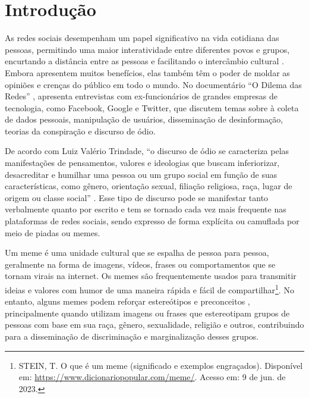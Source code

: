 \chapter{Introdução}
\label{cap:01}

As redes sociais desempenham um papel significativo na vida cotidiana das pessoas, permitindo uma maior interatividade entre diferentes povos e grupos, encurtando a distância entre as pessoas e facilitando o intercâmbio cultural \cite{FortesTecBlog2021}. Embora apresentem muitos benefícios, elas também têm o poder de moldar as opiniões e crenças do público em todo o mundo. No documentário “O Dilema das Redes” \cite{SocialDilemma2020}, apresenta entrevistas com ex-funcionários de grandes empresas de tecnologia, como Facebook, Google e Twitter, que discutem temas sobre à coleta de dados pessoais, manipulação de usuários, disseminação de desinformação, teorias da conspiração e discurso de ódio.


De acordo com Luiz Valério Trindade, ``o discurso de ódio se caracteriza pelas manifestações de pensamentos, valores e ideologias que buscam inferiorizar, desacreditar e humilhar uma pessoa ou um grupo social em função de suas características, como gênero, orientação sexual, filiação religiosa, raça, lugar de origem ou classe social'' \cite{Trindade2022}. Esse tipo de discurso pode se manifestar tanto verbalmente quanto por escrito e tem se tornado cada vez mais frequente nas plataformas de redes sociais, sendo expresso de forma explícita ou camuflada por meio de piadas ou memes.


Um meme é uma unidade cultural que se espalha de pessoa para pessoa, geralmente na forma de imagens, vídeos, frases ou comportamentos que se tornam virais na internet. Os memes são frequentemente usados para transmitir ideias e valores com humor de uma maneira rápida e fácil de compartilhar\footnote{STEIN, T. O que é um meme (significado e exemplos engraçados). Disponível em: \url{https://www.dicionariopopular.com/meme/}. Acesso em: 9 de jun. de 2023.}. No entanto, alguns memes podem reforçar estereótipos e preconceitos \cite{Burke2004}, principalmente quando utilizam imagens ou frases que estereotipam grupos de pessoas com base em sua raça, gênero, sexualidade, religião e outros, contribuindo para a disseminação de discriminação e marginalização desses grupos.

